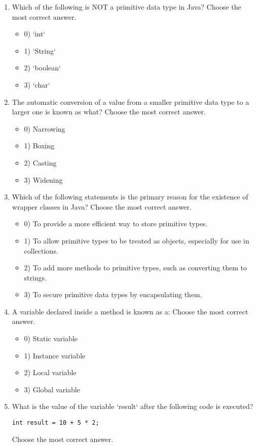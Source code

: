 \documentclass[12pt]{article}
\begin{document}
\begin{enumerate}[label=(\arabic*)]
\begin{itemize}
\end{itemize}
\item Which of the following is NOT a primitive data type in Java?
Choose the most correct answer. 
\begin{itemize}
\item 0) `int`
\item 1) `String`
\item 2) `boolean`
\item 3) `char`
\end{itemize}
\item The automatic conversion of a value from a smaller primitive data type to a larger one is known as what?
Choose the most correct answer. 
\begin{itemize}
\item 0) Narrowing
\item 1) Boxing
\item 2) Casting
\item 3) Widening
\end{itemize}
\item Which of the following statements is the primary reason for the existence of wrapper classes in Java?
Choose the most correct answer. 
\begin{itemize}
\item 0) To provide a more efficient way to store primitive types.
\item 1) To allow primitive types to be treated as objects, especially for use in collections.
\item 2) To add more methods to primitive types, such as converting them to strings.
\item 3) To secure primitive data types by encapsulating them.
\end{itemize}
\item A variable declared inside a method is known as a:
Choose the most correct answer. 
\begin{itemize}
\item 0) Static variable
\item 1) Instance variable
\item 2) Local variable
\item 3) Global variable
\end{itemize}
\item What is the value of the variable `result` after the following code is executed?\n\begin{verbatim}
int result = 10 + 5 * 2;
\end{verbatim}
Choose the most correct answer. 

\end{enumerate}
\end{document}
